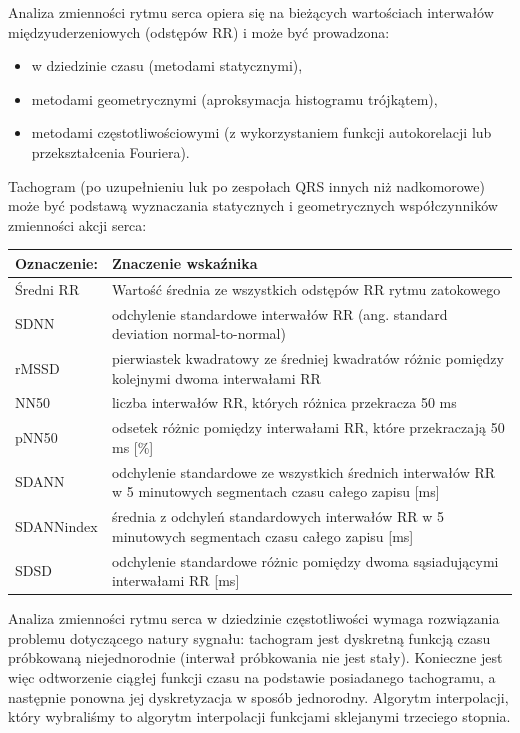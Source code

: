 \documentclass[a4paper, 11pt]{article}
\begin{document}
Analiza zmienności rytmu serca opiera się na bieżących wartościach interwałów międzyuderzeniowych (odstępów RR) i może być prowadzona:
\begin{itemize}
\item w dziedzinie czasu (metodami statycznymi),
\item metodami geometrycznymi (aproksymacja histogramu trójkątem),
\item metodami częstotliwościowymi (z wykorzystaniem funkcji autokorelacji lub przekształcenia Fouriera).
\end{itemize}

Tachogram (po uzupełnieniu luk po zespołach QRS innych niż nadkomorowe) może być podstawą wyznaczania statycznych i geometrycznych współczynników zmienności akcji serca:
\newline
\begin{tabular}{|l|p{14cm}|}
\hline
Oznaczenie: & Znaczenie wskaźnika \\ \hline
Średni RR & Wartość średnia ze wszystkich odstępów RR rytmu zatokowego \\ \hline
SDNN & odchylenie standardowe interwałów RR (ang. standard deviation normal-to-normal) \\ \hline
rMSSD & pierwiastek kwadratowy ze średniej kwadratów różnic pomiędzy kolejnymi dwoma interwałami RR \\ \hline
NN50 & liczba interwałów RR, których różnica przekracza 50 ms \\ \hline
pNN50 & odsetek różnic pomiędzy interwałami RR, które przekraczają 50 ms [\%] \\ \hline
SDANN & odchylenie standardowe ze wszystkich średnich interwałów RR w 5 minutowych segmentach czasu całego zapisu [ms] \\ \hline
SDANNindex & średnia z odchyleń standardowych interwałów RR w 5 minutowych segmentach czasu całego zapisu [ms] \\ \hline
SDSD & odchylenie standardowe różnic pomiędzy dwoma sąsiadującymi interwałami RR [ms] \\
\hline
\end{tabular}
\linebreak

Analiza zmienności rytmu serca w dziedzinie częstotliwości wymaga rozwiązania problemu dotyczącego natury sygnału: tachogram jest dyskretną funkcją czasu próbkowaną niejednorodnie (interwał próbkowania nie jest stały). Konieczne jest więc odtworzenie ciągłej funkcji czasu na podstawie posiadanego tachogramu, a następnie ponowna jej dyskretyzacja w sposób jednorodny.
Algorytm interpolacji, który wybraliśmy to algorytm interpolacji funkcjami sklejanymi trzeciego stopnia.
\end{document}

